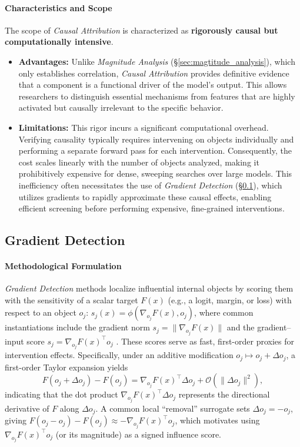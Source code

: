 \documentclass[11pt,letterpaper]{mystyle}
\begin{document}
\paragraph{Characteristics and Scope}
The scope of \textit{Causal Attribution} is characterized as \textbf{rigorously causal but computationally intensive}.
\begin{itemize}[leftmargin=*]
    \item \textbf{Advantages:} Unlike \textit{Magnitude Analysis} (\S\ref{sec:magtitude_analysis}), which only establishes correlation, \textit{Causal Attribution} provides definitive evidence that a component is a functional driver of the model's output. This allows researchers to distinguish essential mechanisms from features that are highly activated but causally irrelevant to the specific behavior.
    \item \textbf{Limitations:} This rigor incurs a significant computational overhead. Verifying causality typically requires intervening on objects individually and performing a separate forward pass for each intervention. Consequently, the cost scales linearly with the number of objects analyzed, making it prohibitively expensive for dense, sweeping searches over large models. This inefficiency often necessitates the use of \textit{Gradient Detection} (\S\ref{sec:gradient_detection}), which utilizes gradients to rapidly approximate these causal effects, enabling efficient screening before performing expensive, fine-grained interventions.
\end{itemize}


\subsection{Gradient Detection}
\label{sec:gradient_detection}

\paragraph{Methodological Formulation}
\textit{Gradient Detection} methods localize influential internal objects by scoring them with the sensitivity of a scalar target $F(x)$ (e.g., a logit, margin, or loss) with respect to an object $o_j$:
$s_j(x)=\phi(\nabla_{o_j}F(x),o_j)$, where common instantiations include the gradient norm $s_j=\|\nabla_{o_j}F(x)\|$ and the gradient--input score $s_j=\nabla_{o_j}F(x)^\top o_j$ \citep{li2016visualizing,sundararajan2017axiomatic}.
These scores serve as fast, first-order proxies for intervention effects.
Specifically, under an additive modification $o_j \mapsto o_j + \Delta o_j$, a first-order Taylor expansion yields
\begin{equation}
F(o_j + \Delta o_j) - F(o_j)
= \nabla_{o_j}F(x)^\top \Delta o_j + \mathcal{O}(\|\Delta o_j\|^2),
\end{equation}
indicating that the dot product $\nabla_{o_j}F(x)^\top \Delta o_j$ represents the directional derivative of $F$ along $\Delta o_j$.
A common local “removal” surrogate sets $\Delta o_j = -o_j$, giving $F(o_j - o_j) - F(o_j) \approx -\nabla_{o_j}F(x)^\top o_j$, which motivates using $\nabla_{o_j}F(x)^\top o_j$ (or its magnitude) as a signed influence score. 
\end{document}
